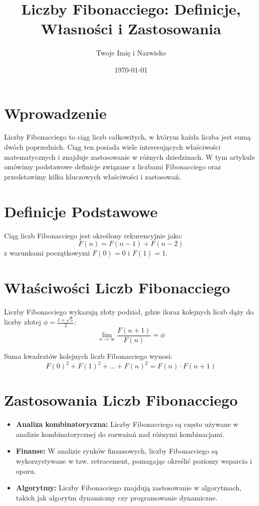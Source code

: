 \documentclass[12pt]{article}
\title{Liczby Fibonacciego: Definicje, Własności i Zastosowania}
\author{Twoje Imię i Nazwisko}
\date{\today}
\begin{document}
\maketitle

\section{Wprowadzenie}
Liczby Fibonacciego to ciąg liczb całkowitych, w którym każda liczba jest sumą dwóch poprzednich. Ciąg ten posiada wiele interesujących właściwości matematycznych i znajduje zastosowanie w różnych dziedzinach. W tym artykule omówimy podstawowe definicje związane z liczbami Fibonacciego oraz przedstawimy kilka kluczowych właściwości i zastosowań.

\section{Definicje Podstawowe}
\begin{definition}
Ciąg liczb Fibonacciego jest określony rekurencyjnie jako:
\[
F(n) = F(n-1) + F(n-2)
\]
z warunkami początkowymi $F(0) = 0$ i $F(1) = 1$.
\end{definition}

\section{Właściwości Liczb Fibonacciego}
\begin{theorem}
Liczby Fibonacciego wykazują złoty podział, gdzie iloraz kolejnych liczb dąży do liczby złotej $\phi = \frac{1 + \sqrt{5}}{2}$:
\[
\lim_{n \to \infty} \frac{F(n+1)}{F(n)} = \phi
\]
\end{theorem}

\begin{theorem}
Suma kwadratów kolejnych liczb Fibonacciego wynosi:
\[
F(0)^2 + F(1)^2 + \ldots + F(n)^2 = F(n) \cdot F(n+1)
\]
\end{theorem}

\section{Zastosowania Liczb Fibonacciego}
\begin{itemize}
  \item \textbf{Analiza kombinatoryczna:} Liczby Fibonacciego są często używane w analizie kombinatorycznej do rozważań nad różnymi kombinacjami.
  \item \textbf{Finanse:} W analizie rynków finansowych, liczby Fibonacciego są wykorzystywane w tzw. retracement, pomagając określić poziomy wsparcia i oporu.
  \item \textbf{Algorytmy:} Liczby Fibonacciego znajdują zastosowanie w algorytmach, takich jak algorytm dynamiczny czy programowanie dynamiczne.
\end{itemize}
\end{document}
